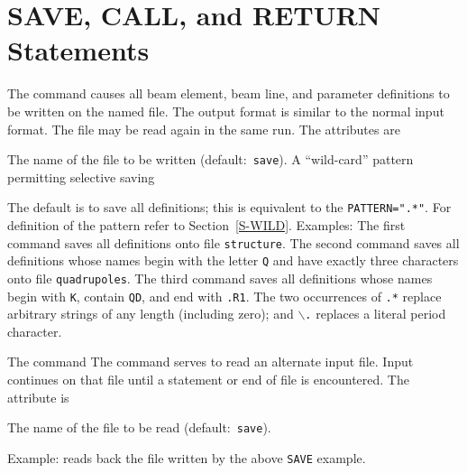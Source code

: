 \section{SAVE, CALL, and RETURN Statements}
\label{S-IMBED}
The  command
causes all beam element, beam line, and parameter definitions
to be written on the named file.
The output format is similar to the normal input format.
The file may be read again in the same run.
The attributes are
\begin{mylist}
The name of the file to be written (default:~{\tt save}).
A ``wild-card'' pattern permitting selective saving
\end{mylist}
The default is to save all definitions;
this is equivalent to the {\tt PATTERN=".*"}.
For definition of the pattern refer to Section~\ref{S-WILD}.
Examples:
The first command saves all definitions onto file {\tt structure}.
The second command saves all definitions
whose names begin with the letter {\tt Q} and have exactly three
characters onto file {\tt quadrupoles}.
The third command saves all definitions whose names begin with {\tt K},
contain {\tt QD}, and end with {\tt .R1}.
The two occurrences of {\tt .*} replace arbitrary strings of any length
(including zero);
and {\tt \(\backslash\).} replaces a literal period character.
 
The command
The  command
serves to read an alternate input file.
Input continues on that file until a  statement
or end of file is encountered.
The attribute is
\begin{mylist}
The name of the file to be read (default:~{\tt save}).
\end{mylist}
Example:
reads back the file written by the above {\tt SAVE} example.
 

